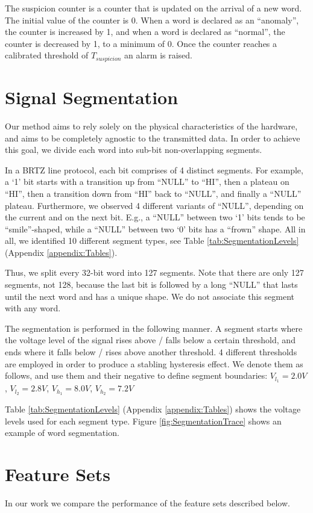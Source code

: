 \documentclass[english]{llncs}
\newcommand{\level}[1]{\section{#1}}
\newcommand{\level}[1]{\chapter{#1}}
\begin{document}
  The suspicion counter is a counter that is updated on the arrival of a new word. The initial value of the counter is 0. When a word is declared as an ``anomaly'', the counter is increased by 1, and when a word is declared as ``normal'', the counter is decreased by 1, to a minimum of 0. Once the counter reaches a calibrated threshold of $T_{suspicion}$ an alarm is raised.
  
\level{Signal Segmentation} \label{SignalSegmentation}
  Our method aims to rely solely on the physical characteristics of the hardware, and aims to be completely agnostic to the transmitted data. In order to achieve this goal, we divide each word into sub-bit non-overlapping segments.
  
  In a BRTZ line protocol, each bit comprises of 4 distinct segments. For example, a `1' bit starts with a transition up from ``NULL'' to ``HI'', then a plateau on ``HI'', then a transition down from ``HI'' back to ``NULL'', and finally a ``NULL'' plateau. Furthermore, we observed 4 different variants of ``NULL'', depending on the current and on the next bit. E.g., a ``NULL'' between two `1' bits tends to be ``smile''-shaped, while a ``NULL'' between two `0' bits has a ``frown'' shape. All in all, we identified 10 different segment types, see Table \ref{tab:SegmentationLevels} (Appendix \ref{appendix:Tables}).
  
  Thus, we split every 32-bit word into 127 segments. Note that there are only 127 segments, not 128, because the last bit is followed by a long ``NULL'' that lasts until the next word and has a unique shape. We do not associate this segment with any word.
  
  The segmentation is performed in the following manner. A segment starts where the voltage level of the signal rises above / falls below a certain threshold, and ends where it falls below / rises above another threshold. 4 different thresholds are employed in order to produce a stabling hysteresis effect. We denote them as follows, and use them and their negative to define segment boundaries: \(V_{l_1} = 2.0V\), \(V_{l_2} = 2.8V\), \(V_{h_1} = 8.0V\), \(V_{h_2} = 7.2V\)
  
  Table \ref{tab:SegmentationLevels} (Appendix \ref{appendix:Tables}) shows the voltage levels used for each segment type. Figure \ref{fig:SegmentationTrace} shows an example of word segmentation.
  
\level{Feature Sets} \label{FeatureSets}
  In our work we compare the performance of the feature sets described below.
 
\end{document}
